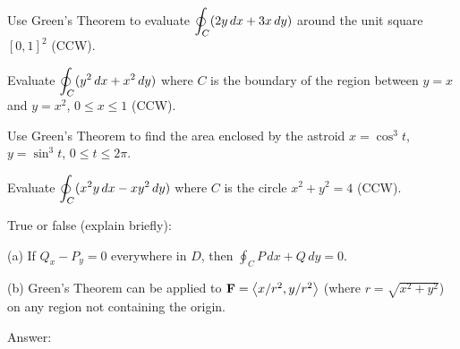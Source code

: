 \documentclass[11pt]{article}
\begin{document}
\begin{practice}

\prob
Use Green's Theorem to evaluate $\displaystyle\oint_C (2y\,dx + 3x\,dy)$ around the unit square $[0,1]^2$ (CCW).


\vspace{2.5cm}

\prob
Evaluate $\displaystyle\oint_C (y^2\,dx + x^2\,dy)$ where $C$ is the boundary of the region between $y = x$ and $y = x^2$, $0 \le x \le 1$ (CCW).


\vspace{4cm}

\prob
Use Green's Theorem to find the area enclosed by the astroid $x = \cos^3 t$, $y = \sin^3 t$, $0 \le t \le 2\pi$.


\vspace{4cm}

\prob
Evaluate $\displaystyle\oint_C (x^2 y\,dx - xy^2\,dy)$ where $C$ is the circle $x^2 + y^2 = 4$ (CCW).


\vspace{4cm}

\prob
True or false (explain briefly):

(a) If $Q_x - P_y = 0$ everywhere in $D$, then $\oint_C P\,dx + Q\,dy = 0$.

(b) Green's Theorem can be applied to $\mathbf{F} = \left\langle x/r^2, y/r^2 \right\rangle$ (where $r = \sqrt{x^2+y^2}$) on any region not containing the origin.

Answer: 

\end{practice}
\end{document}
